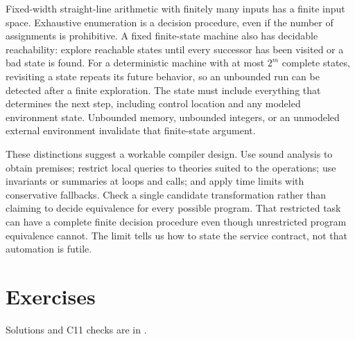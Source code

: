 Fixed-width straight-line arithmetic with finitely many inputs has a finite input space.
Exhaustive enumeration is a decision procedure, even if the number of assignments is prohibitive.
A fixed finite-state machine also has decidable reachability: explore reachable states until every successor has been visited or a bad state is found.
For a deterministic machine with at most $2^m$ complete states, revisiting a state repeats its future behavior, so an unbounded run can be detected after a finite exploration.
The state must include everything that determines the next step, including control location and any modeled environment state.
Unbounded memory, unbounded integers, or an unmodeled external environment invalidate that finite-state argument.

These distinctions suggest a workable compiler design.
Use sound analysis to obtain premises; restrict local queries to theories suited to the operations; use invariants or summaries at loops and calls; and apply time limits with conservative fallbacks.
Check a single candidate transformation rather than claiming to decide equivalence for every possible program.
That restricted task can have a complete finite decision procedure even though unrestricted program equivalence cannot.
The limit tells us how to state the service contract, not that automation is futile.

\section{Exercises}
\label{sec:ch41-exercises}

Solutions and C11 checks are in .

